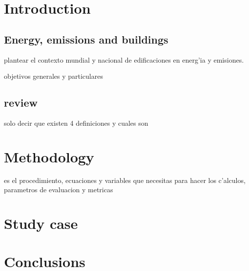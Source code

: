 


\chapter{Introduction}
\label{chap:introduccion}


\section{Energy, emissions and buildings}
plantear el contexto mundial y nacional de edificaciones en energ'ia y emisiones. 


objetivos generales y particulares


\section{review}
 
 solo decir que existen 4 definiciones y cuales son





\chapter{Methodology}
es el procedimiento, ecuaciones y variables que necesitas para hacer los c'alculos, parametros de evaluacion y metricas


\chapter{Study case}


\chapter{Conclusions}